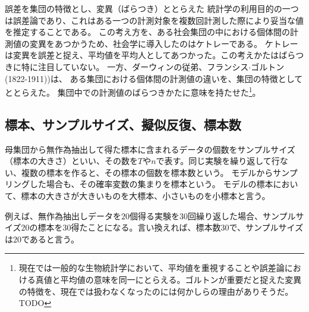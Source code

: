 \begin{SMbox}{誤差を集団の特徴とし、変異（ばらつき）ととらえた}
 統計学の利用目的の一つは誤差論であり、これはある一つの計測対象を複数回計測した際により妥当な値を推定することである。
 この考え方を、ある社会集団の中における個体間の計測値の変異をあつかうため、社会学に導入したのはケトレーである。
 ケトレーは変異を誤差と捉え、平均値を平均人としてあつかった。この考えかたはばらつきに特に注目していない。
 一方、ダーウィンの従弟、フランシス$\cdot$ゴルトン(1822-1911))は、 ある集団における個体間の計測値の違いを、集団の特徴としてととらえた。 集団中での計測値のばらつきかたに意味を持たせた\footnote{現在では一般的な生物統計学において、平均値を重視することや誤差論における真値と平均値の意味を同一にとらえる。ゴルトンが重要だと捉えた変異の特徴を、現在では扱わなくなったのには何かしらの理由がありそうだ。TODO}。

\end{SMbox}

\subsection{標本、サンプルサイズ、擬似反復、標本数}
\begin{defi}
母集団から無作為抽出して得た標本に含まれるデータの個数をサンプルサイズ（標本の大きさ）といい、その数を$T$や$n$で表す。同じ実験を繰り返して行ない、複数の標本を作ると、その標本の個数を標本数という。
モデルからサンプリングした場合も、その確率変数の集まりを標本という。
モデルの標本において、標本の大きさが大きいものを大標本、小さいものを小標本と言う。
\end{defi}
例えば、無作為抽出しデータを$20$個得る実験を30回繰り返した場合、サンプルサイズ$20$の標本を$30$得たことになる。言い換えれば、標本数$30$で、サンプルサイズは$20$であると言う。


